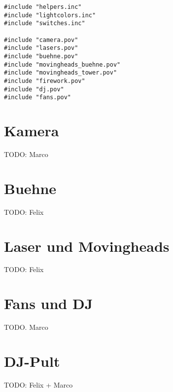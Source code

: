 \documentclass[paper=a4]{scrartcl}
\begin{document}
\begin{lstlisting}
#include "helpers.inc"
#include "lightcolors.inc"
#include "switches.inc"

#include "camera.pov"
#include "lasers.pov"
#include "buehne.pov"
#include "movingheads_buehne.pov"
#include "movingheads_tower.pov"
#include "firework.pov"
#include "dj.pov"
#include "fans.pov"
\end{lstlisting}

\section{Kamera}
TODO: Marco
\section{Buehne}
TODO: Felix
\section{Laser und Movingheads}
TODO: Felix
\section{Fans und DJ}
TODO. Marco
\section{DJ-Pult}
TODO: Felix + Marco
\end{document}
